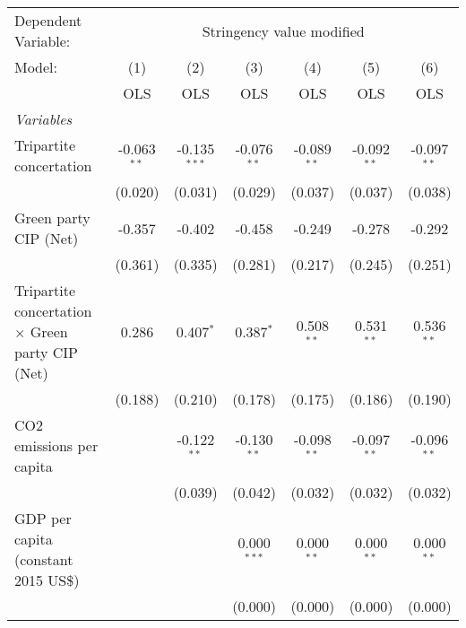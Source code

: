 
\begingroup
\centering
\begin{tabular}{lcccccc}
   \toprule
   Dependent Variable: & \multicolumn{6}{c}{Stringency value modified}\\
   Model:                                                  & (1)           & (2)            & (3)           & (4)           & (5)           & (6)\\  
                                                           &  OLS          & OLS            & OLS           & OLS           & OLS           & OLS\\  
   \midrule
   \emph{Variables}\\
   Tripartite concertation                                 & -0.063$^{**}$ & -0.135$^{***}$ & -0.076$^{**}$ & -0.089$^{**}$ & -0.092$^{**}$ & -0.097$^{**}$\\   
                                                           & (0.020)       & (0.031)        & (0.029)       & (0.037)       & (0.037)       & (0.038)\\   
   Green party CIP (Net)                                   & -0.357        & -0.402         & -0.458        & -0.249        & -0.278        & -0.292\\   
                                                           & (0.361)       & (0.335)        & (0.281)       & (0.217)       & (0.245)       & (0.251)\\   
   Tripartite concertation $\times$ Green party CIP (Net)  & 0.286         & 0.407$^{*}$    & 0.387$^{*}$   & 0.508$^{**}$  & 0.531$^{**}$  & 0.536$^{**}$\\   
                                                           & (0.188)       & (0.210)        & (0.178)       & (0.175)       & (0.186)       & (0.190)\\   
   CO2 emissions per capita                                &               & -0.122$^{**}$  & -0.130$^{**}$ & -0.098$^{**}$ & -0.097$^{**}$ & -0.096$^{**}$\\   
                                                           &               & (0.039)        & (0.042)       & (0.032)       & (0.032)       & (0.032)\\   
   GDP per capita (constant 2015 US\$)                     &               &                & 0.000$^{***}$ & 0.000$^{**}$  & 0.000$^{**}$  & 0.000$^{**}$\\   
                                                           &               &                & (0.000)       & (0.000)       & (0.000)       & (0.000)\\   

\end{tabular}

